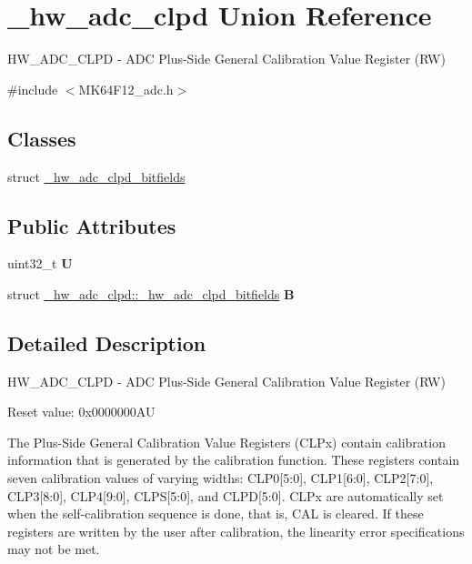 \hypertarget{union__hw__adc__clpd}{}\section{\+\_\+hw\+\_\+adc\+\_\+clpd Union Reference}
\label{union__hw__adc__clpd}


H\+W\+\_\+\+A\+D\+C\+\_\+\+C\+L\+PD -\/ A\+DC Plus-\/\+Side General Calibration Value Register (RW)  




{\ttfamily \#include $<$M\+K64\+F12\+\_\+adc.\+h$>$}

\subsection*{Classes}
\begin{DoxyCompactItemize}
\item 
struct \hyperlink{struct__hw__adc__clpd_1_1__hw__adc__clpd__bitfields}{\+\_\+hw\+\_\+adc\+\_\+clpd\+\_\+bitfields}
\end{DoxyCompactItemize}
\subsection*{Public Attributes}
\begin{DoxyCompactItemize}
\item 
uint32\+\_\+t {\bfseries U}\hypertarget{union__hw__adc__clpd_ad46c96767606cf93f39f5155b50c3d3b}{}\label{union__hw__adc__clpd_ad46c96767606cf93f39f5155b50c3d3b}

\item 
struct \hyperlink{struct__hw__adc__clpd_1_1__hw__adc__clpd__bitfields}{\+\_\+hw\+\_\+adc\+\_\+clpd\+::\+\_\+hw\+\_\+adc\+\_\+clpd\+\_\+bitfields} {\bfseries B}\hypertarget{union__hw__adc__clpd_a975d0bea4e6f4ce8cf28fc9c4080e3a4}{}\label{union__hw__adc__clpd_a975d0bea4e6f4ce8cf28fc9c4080e3a4}

\end{DoxyCompactItemize}


\subsection{Detailed Description}
H\+W\+\_\+\+A\+D\+C\+\_\+\+C\+L\+PD -\/ A\+DC Plus-\/\+Side General Calibration Value Register (RW) 

Reset value\+: 0x0000000\+AU

The Plus-\/\+Side General Calibration Value Registers (C\+L\+Px) contain calibration information that is generated by the calibration function. These registers contain seven calibration values of varying widths\+: C\+L\+P0\mbox{[}5\+:0\mbox{]}, C\+L\+P1\mbox{[}6\+:0\mbox{]}, C\+L\+P2\mbox{[}7\+:0\mbox{]}, C\+L\+P3\mbox{[}8\+:0\mbox{]}, C\+L\+P4\mbox{[}9\+:0\mbox{]}, C\+L\+PS\mbox{[}5\+:0\mbox{]}, and C\+L\+PD\mbox{[}5\+:0\mbox{]}. C\+L\+Px are automatically set when the self-\/calibration sequence is done, that is, C\+AL is cleared. If these registers are written by the user after calibration, the linearity error specifications may not be met. 

